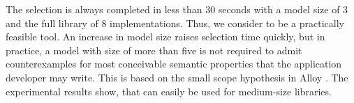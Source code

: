 The selection is always completed in less than 30 seconds with a model size of 3 and the full library of 8 implementations.
Thus, we consider \Primrose{} to be a practically feasible tool.
An increase in model size raises selection time quickly, but in practice, a model with size of more than five is not required to admit counterexamples for most conceivable semantic properties that the application developer may write. This is based on the small scope hypothesis in Alloy \cite{jackson2012software}.
The experimental results show, that \Primrose{} can easily be used for medium-size libraries.

